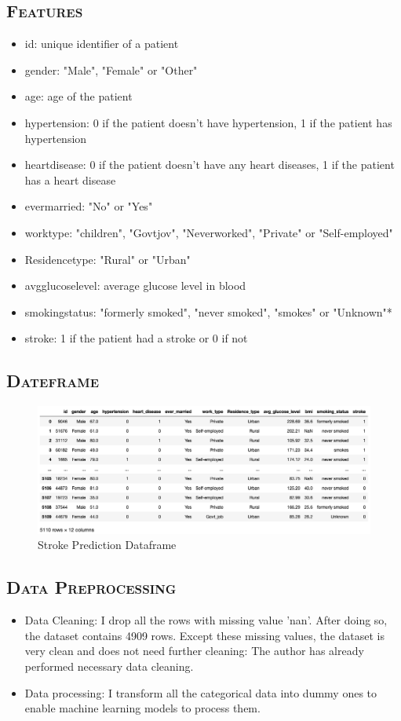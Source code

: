 \documentclass[a4paper,12pt]{article}
\begin{document}
\subsection{\textsc{Features}}
\begin{itemize}
\item id: unique identifier of a patient
\item gender: "Male", "Female" or "Other"
\item age: age of the patient
\item hypertension: 0 if the patient doesn't have hypertension, 1 if the patient has hypertension
\item heart\textunderscore disease: 0 if the patient doesn't have any heart diseases, 1 if the patient has a heart disease
\item ever\textunderscore married: "No" or "Yes"
\item work\textunderscore type: "children", "Govt\textunderscore jov", "Never\textunderscore worked", "Private" or "Self-employed"
\item Residence\textunderscore type: "Rural" or "Urban"
\item avg\textunderscore glucose\textunderscore level: average glucose level in blood
\item smoking\textunderscore status: "formerly smoked", "never smoked", "smokes" or "Unknown"*
\item stroke: 1 if the patient had a stroke or 0 if not
\end{itemize}
\subsection{\textsc{Dateframe}}
\begin{figure}[h] 
    \centering
    \includegraphics[width=1\textwidth]{p1} 
    \caption{Stroke Prediction Dataframe} 
\end{figure}
\subsection{\textsc{Data Preprocessing}}
\begin{itemize}
\item Data Cleaning: I drop all the rows with missing value 'nan'. After doing so, the dataset contains 4909 rows. Except these missing values, the dataset is very clean and does not need further cleaning: The author has already performed necessary data cleaning.
\item Data processing: I transform all the categorical data into dummy ones to enable machine learning models to process them.
\end{itemize}
\end{document}

